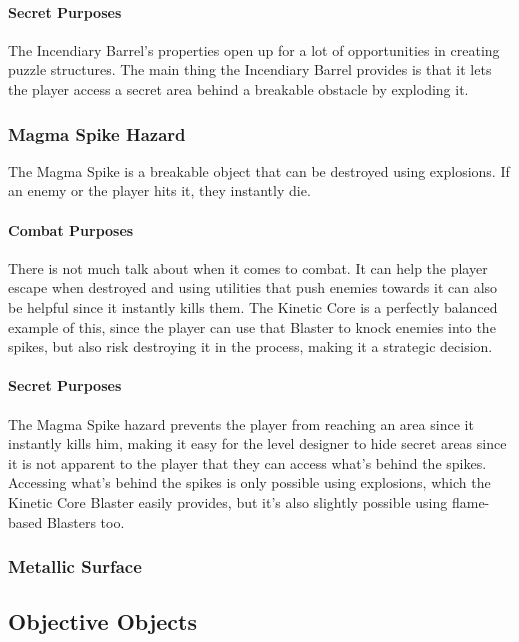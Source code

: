 \documentclass[12pt]{article}
\begin{document}
\paragraph{Secret Purposes}

The Incendiary Barrel's properties open up for a lot of opportunities in creating puzzle structures. The main thing the Incendiary Barrel provides is that it lets the player access a secret area behind a breakable obstacle by exploding it. 

\subsubsection{Magma Spike Hazard}

The Magma Spike is a breakable object that can be destroyed using explosions. If an enemy or the player hits it, they instantly die. 

\paragraph{Combat Purposes}

There is not much talk about when it comes to combat. It can help the player escape when destroyed and using utilities that push enemies towards it can also be helpful since it instantly kills them. The Kinetic Core is a perfectly balanced example of this, since the player can use that Blaster to knock enemies into the spikes, but also risk destroying it in the process, making it a strategic decision.

\paragraph{Secret Purposes}

The Magma Spike hazard prevents the player from reaching an area since it instantly kills him, making it easy for the level designer to hide secret areas since it is not apparent to the player that they can access what's behind the spikes. Accessing what's behind the spikes is only possible using explosions, which the Kinetic Core Blaster easily provides, but it's also slightly possible using flame-based Blasters too. 

\subsubsection{Metallic Surface}

\subsection{Objective Objects}
\end{document}
